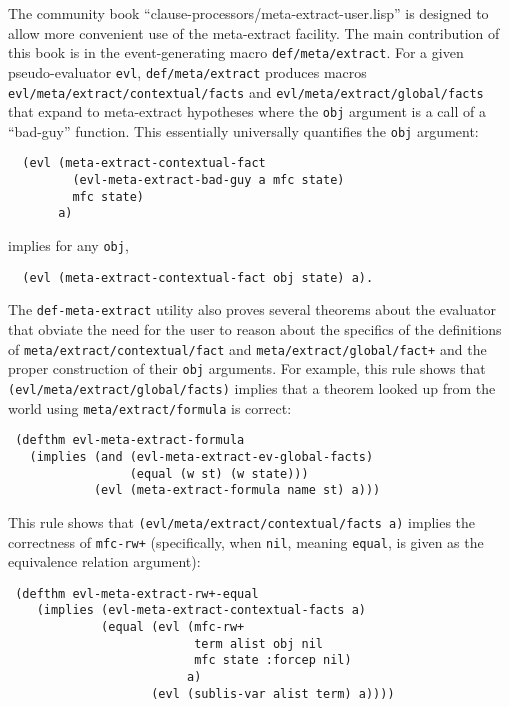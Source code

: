 The community book ``clause-processors/meta-extract-user.lisp'' is
designed to allow more convenient use of the meta-extract facility.
The main contribution of this book is in the event-generating macro
\texttt{def\-/meta\-/extract}. For a given pseudo-evaluator \texttt{evl},
\texttt{def\-/meta\-/extract} produces macros
\texttt{evl\-/meta\-/extract\-/contextual\-/facts} and
\texttt{evl\-/meta\-/extract\-/global\-/facts} that expand to meta-extract
hypotheses where the \texttt{obj} argument is a call of a ``bad-guy''
function.  This essentially universally quantifies the \texttt{obj}
argument:
\begin{verbatim}
  (evl (meta-extract-contextual-fact
         (evl-meta-extract-bad-guy a mfc state)
         mfc state)
       a)
\end{verbatim}
implies for any \texttt{obj},
\begin{verbatim}
  (evl (meta-extract-contextual-fact obj state) a).
\end{verbatim}

The \texttt{def-meta-extract} utility also proves several theorems
about the evaluator that obviate the need for the user to reason about
the specifics of the definitions of
\texttt{meta\-/extract\-/contextual\-/fact} and
\texttt{meta\-/extract\-/global\-/fact+} and the proper construction of
their \texttt{obj} arguments.  For example, this rule shows that
\texttt{(evl\-/meta\-/extract\-/global\-/facts)} implies that a theorem looked
up from the world using \texttt{meta\-/extract\-/formula} is correct:
\begin{verbatim}
 (defthm evl-meta-extract-formula
   (implies (and (evl-meta-extract-ev-global-facts)
                 (equal (w st) (w state)))
            (evl (meta-extract-formula name st) a)))

\end{verbatim}
This rule shows that
\texttt{(evl\-/meta\-/extract\-/contextual\-/facts a)} implies the correctness
of \texttt{mfc-rw+} (specifically, when \texttt{nil}, meaning
\texttt{equal}, is given as the equivalence relation argument):
\begin{verbatim}
 (defthm evl-meta-extract-rw+-equal
    (implies (evl-meta-extract-contextual-facts a)
             (equal (evl (mfc-rw+
                          term alist obj nil
                          mfc state :forcep nil)
                         a)
                    (evl (sublis-var alist term) a))))
\end{verbatim}

